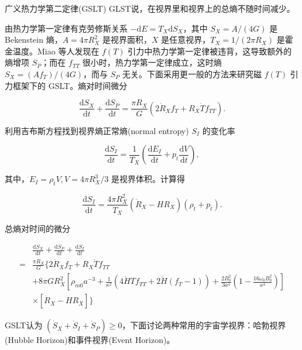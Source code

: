 \documentclass[9pt, dvipsnames]{beamer} %
\begin{document}
\begin{frame}{广义热力学第二定律(GSLT)}
    GLST说，在视界里和视界上的总熵不随时间减少。

    由热力学第一定律有克劳修斯关系 $-\mathrm{d}E=T_X\mathrm{d}S_X$，其中 $S_X=A/(4G)$ 是 Bekenstein 熵，$A=4\pi R_X^2$ 是视界面积，$X$ 是任意视界，$T_X=1/(2\pi R_X)$ 是霍金温度。Miao 等人发现在 $f(T)$ 引力中热力学第一定律被违背，这导致额外的熵增项 $S_P$；而在 $f_{TT}$ 很小时，热力学第一定律成立，这时熵 $S_X=(Af_T)/(4G)$，而与 $S_P$ 无关。下面采用更一般的方法来研究磁 $f(T)$ 引力框架下的 GSLT。熵对时间微分

    $$
    \frac{\mathrm{d}S_X }{\mathrm{d}t } + \frac{\mathrm{d}S_P }{\mathrm{d}t } = \frac{\pi R_X }{G } \left(2\dot{R}_X f_T + R_X\dot{T} f_{TT} \right).
    $$

    利用吉布斯方程找到视界熵正常熵(normal entropy) $S_I$ 的变化率

    $$
    \frac{\mathrm{d}S_I }{\mathrm{d}t } 
    =\frac{1 }{T_X } \left(\frac{\mathrm{d}E_I }{\mathrm{d}t } + p_t\frac{\mathrm{d}V }{\mathrm{d}t }  \right),
    $$

    其中，$E_I=\rho_t V,V=4\pi R_X^3/3$ 是视界体积。计算得

    $$
    \frac{\mathrm{d}S_I }{\mathrm{d}t } 
    =\frac{4\pi R_X^2 }{T_X } \left(\dot{R}_X - H R_X \right)\left(\rho_t+p_t \right).
    $$
    
\end{frame}

\begin{frame}
    总熵对时间的微分

    $$
    \begin{aligned}
        &\frac{\mathrm{d}S_X }{\mathrm{d}t } + \frac{\mathrm{d}S_P }{\mathrm{d}t } + \frac{\mathrm{d}S_I }{\mathrm{d}t } \\
        =&\frac{\pi R_X }{G } \bigg\{2\dot{R}_X f_T + R_X\dot{T}f_{TT} \\
        &+ 8\pi G R_X^2 \left[\rho_{m0}a^{-3} + \frac{1 }{\kappa^2 } \left(4\dot{H} T f_{TT} + 2\dot{H}\left(f_T-1 \right) \right) + \frac{2B_0^2 }{3a^4 } \left(1-\frac{16\omega_0 B_0^2 }{a^4 }  \right) \right] \\
        &\times \left[\dot{R}_X - H R_X \right] \bigg\}
    \end{aligned}
    $$

    GSLT认为 $(\dot{S}_X+\dot{S}_I+\dot{S}_P)\geqslant 0$，下面讨论两种常用的宇宙学视界：哈勃视界(Hubble Horizon)和事件视界(Event Horizon)。

\end{frame}
\end{document}
